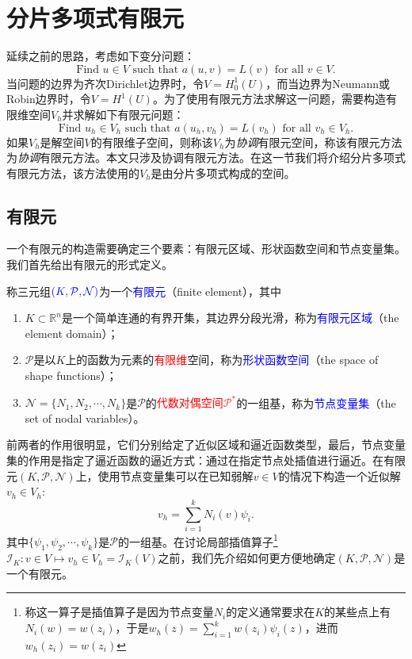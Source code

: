 \documentclass[a4paper,10pt]{ctexart}
\begin{document}
\section{分片多项式有限元}
延续之前的思路，考虑如下变分问题：
\begin{equation}
    \text{Find } u \in V \text{ such that } a(u,v) = L(v) \text{ for all } v \in V.
\end{equation}
当问题的边界为齐次Dirichlet边界时，令$ V = H^1_0(U) $，而当边界为Neumann或Robin边界时，令$ V = H^1(U) $。为了使用有限元方法求解这一问题，需要构造有限维空间$ V_h $并求解如下有限元问题：
\begin{equation}
    \text{Find } u_h \in V_h \text{ such that } a(u_h,v_h) = L(v_h) \text{ for all } v_h \in V_h.
\end{equation}
如果$ V_h $是解空间$ V $的有限维子空间，则称该$ V_h $为\emph{协调}有限元空间，称该有限元方法为\emph{协调}有限元方法。本文只涉及协调有限元方法。在这一节我们将介绍分片多项式有限元方法，该方法使用的$ V_h $是由分片多项式构成的空间。

\subsection{有限元}
一个有限元的构造需要确定三个要素：有限元区域、形状函数空间和节点变量集。我们首先给出有限元的形式定义。
\begin{definition}
    称三元组$ \textcolor{blue}{(K,\mathcal{P},\mathcal{N})} $为一个\textcolor{blue}{有限元}（finite element），其中
    \begin{enumerate}
        \item $ K\subset \mathbb{R}^n $是一个简单连通的有界开集，其边界分段光滑，称为\textcolor{blue}{有限元区域}（the element domain）；
        \item $ \mathcal{P} $是以$ K $上的函数为元素的\textcolor{red}{有限维}空间，称为\textcolor{blue}{形状函数空间}（the space of shape functions）；
        \item $ \mathcal{N} = \{N_1,N_2,\cdots ,N_k\} $是$ \mathcal{P} $的\textcolor{red}{代数对偶空间$ \mathcal{P}^* $}的一组基，称为\textcolor{blue}{节点变量集}（the set of nodal variables）。
    \end{enumerate}
\end{definition}
\noindent 前两者的作用很明显，它们分别给定了近似区域和逼近函数类型，最后，节点变量集的作用是指定了逼近函数的逼近方式：通过在指定节点处插值进行逼近。在有限元$ (K,\mathcal{P},\mathcal{N}) $上，使用节点变量集可以在已知弱解$ v\in V $的情况下构造一个近似解$ v_h\in V_h $:
\begin{equation}
    v_h =\sum_{i=1}^k N_i(v)\psi_i.
\end{equation}
其中$ \{\psi_1,\psi_2,\cdots ,\psi_k\} $是$ \mathcal{P} $的一组基。在讨论局部插值算子\footnote{称这一算子是插值算子是因为节点变量$ N_i $的定义通常要求在$ K $的某些点上有$ N_i(w) = w(z_i) $，于是$ w_h(z) = \sum_{i=1}^k w(z_i)\psi_i(z) $，进而$ w_h(z_i) = w(z_i) $}$ \mathcal{I}_K:v\in V\mapsto v_h\in V_h=\mathcal{I}_K(V) $之前，我们先介绍如何更方便地确定$ (K,\mathcal{P},\mathcal{N}) $是一个有限元。
\end{document}
